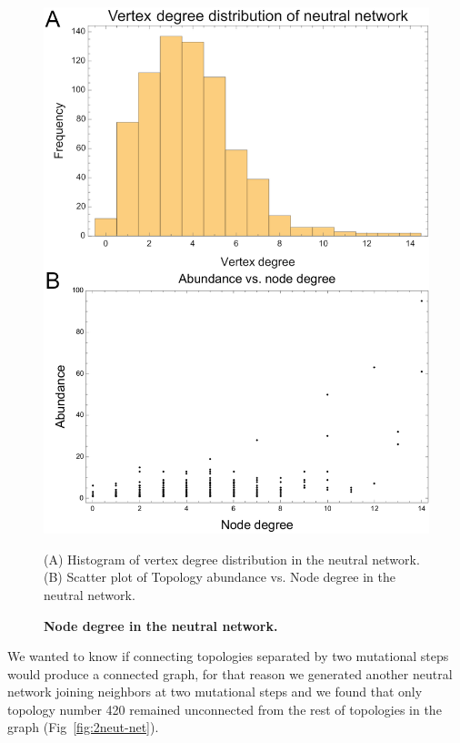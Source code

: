 \documentclass[10pt,letterpaper]{article}
\begin{document}
\begin{figure}[!h]
 \includegraphics[width=\textwidth]{figures/results/Fig4}
 \caption{\bf Node degree in the neutral network.}
 (A) Histogram of vertex degree distribution in the neutral network.
 (B) Scatter plot of Topology abundance vs. Node degree in the neutral
 network.
 \label{fig:deg-dist}
\end{figure}

We wanted to know if connecting topologies separated by two mutational steps
would produce a connected graph, for that reason we generated another neutral
network joining neighbors at two mutational steps and we found that only
topology number 420 remained unconnected from the rest of topologies in the
graph (Fig~\ref{fig:2neut-net}).
\end{document}

